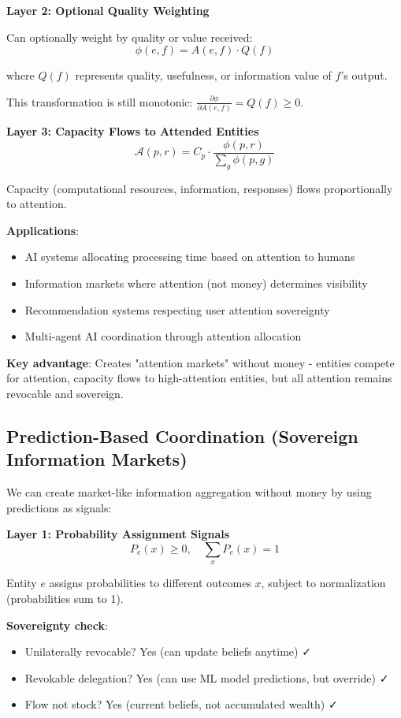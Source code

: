 \documentclass[11pt,a4paper]{article}
\theoremstyle{definition}
\theoremstyle{remark}
\newcommand{\A}{\mathcal{A}}
\begin{document}
\textbf{Layer 2: Optional Quality Weighting}

Can optionally weight by quality or value received:
\[ \phi(e,f) = A(e,f) \cdot Q(f) \]

where $Q(f)$ represents quality, usefulness, or information value of $f$'s output.

This transformation is still monotonic: $\frac{\partial \phi}{\partial A(e,f)} = Q(f) \ge 0$.

\textbf{Layer 3: Capacity Flows to Attended Entities}
\[ \A(p,r) = C_p \cdot \frac{\phi(p,r)}{\sum_g \phi(p,g)} \]

Capacity (computational resources, information, responses) flows proportionally to attention.

\textbf{Applications}:
\begin{itemize}
\item AI systems allocating processing time based on attention to humans
\item Information markets where attention (not money) determines visibility
\item Recommendation systems respecting user attention sovereignty
\item Multi-agent AI coordination through attention allocation
\end{itemize}

\textbf{Key advantage}: Creates "attention markets" without money - entities compete for attention, capacity flows to high-attention entities, but all attention remains revocable and sovereign.

\subsection{Prediction-Based Coordination (Sovereign Information Markets)}

We can create market-like information aggregation without money by using predictions as signals:

\textbf{Layer 1: Probability Assignment Signals}
\[ P_e(x) \ge 0, \quad \sum_x P_e(x) = 1 \]

Entity $e$ assigns probabilities to different outcomes $x$, subject to normalization (probabilities sum to 1).

\textbf{Sovereignty check}:
\begin{itemize}
\item Unilaterally revocable? Yes (can update beliefs anytime) ✓
\item Revokable delegation? Yes (can use ML model predictions, but override) ✓
\item Flow not stock? Yes (current beliefs, not accumulated wealth) ✓
\end{itemize}
\end{document}
